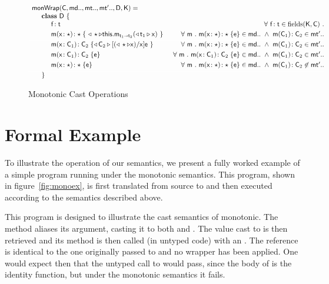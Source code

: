 \documentclass[sigconf]{acmart}
\begin{document}
\begin{figure*}
\begin{center}
\begin{minipage}{12cm}
\vspace{5mm}

\[\begin{array}{l@{~}r@{}r@{~}r@{~}r@{~}rr}
\arrayrulecolor{white}
\classgen{\C, \md.., \mt.., \mtp.., \D, \K}= \\
  \SP \class~\D~\{ \\
    \SPP \Fdef\f\t   &
        \All{\f\!:\t\in\text{fields}(\K,\C)} \\[1mm]
    \SPP \Mdef\m\x\any\any{~\MonCast\any{\KCall\this\m{\MonCast{\t[1]}\x}{\t[1]}{\t[2]}}~}\HS\HS & 
          \All\m \Mdef\m\x{\any}{\any}\e\in\md..  ~\AND~ \Mtype\m{\C_1}{\C_2}\in{\mtp..}
\\[1mm]\hline
\SPP \Mdef\m\x{\C_1}{\C_2} {\MonCast{\C_2}{[{(\MonCast{\any}\x)}/\x]\e}~}
&     \All \m \Mdef\m\x{\any}{\any}\e\in\md.. ~\AND~ \Mtype\m{\C_1}{\C_2}\in\mtp.. 
\\[1mm]\hline
\SPP \Mdef\m\x{\C_1}{\C_2} {\e}~
&     \All \m \Mdef\m\x{\C_1}{\C_2}\e\in\md.. ~\AND~ \Mtype\m{\C_1}{\C_2}\in\mtp.. 
\\[1mm]\hline
\SPP \Mdef\m\x{\any}{\any} {\e}~
&     \All \m \Mdef\m\x{\any}{\any}\e\in\md.. ~\AND~ \Mtype\m{\C_1}{\C_2}\not\in\mtp.. 
\\[1mm]\hline
\SP\}
\end{array}
\]\end{minipage}\end{center}
\caption{Monotonic Cast Operations}
\label{moncast}
\end{figure*}

\section{Formal Example}

To illustrate the operation of our semantics, we present a fully worked
example of a simple program running under the monotonic semantics. This
program, shown in figure~\ref{fig:monoex}, is first translated from source to
\kafka and then executed according to the \kafka semantics described above.

This program is designed to illustrate the cast semantics of monotonic. The
method  aliases its argument, casting it to both \C and \D. The
value cast to \C is then retrieved and its method  is then called
(in untyped code) with an . The reference is identical to the one
originally passed to  and no wrapper has been applied. One would
expect then that the untyped call to  would pass, since the body of
 is the identity function, but under the monotonic semantics it
fails.
\end{document}
